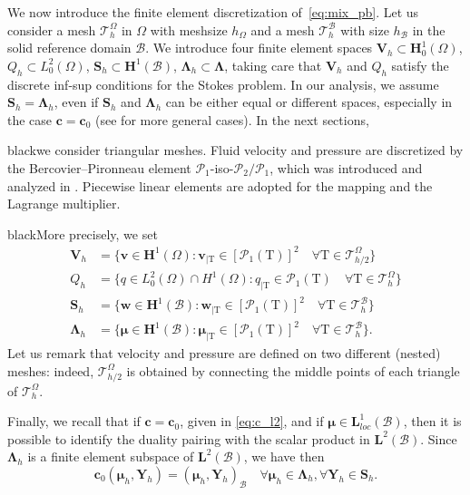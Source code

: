 \documentclass[oneside]{amsart} %
\newcommand\Huo{\mathbf{H}^1_0(\Omega)}%
\newcommand\Ldo{L^2_0(\Omega)} %
\newcommand\Hub{\mathbf{H}^1(\B)} %
\newcommand\HuOm{\mathbf{H}^1(\Omega)} %
\newcommand\LdBd{\mathbf{L}^2(\B)} %
\newcommand\B{\mathcal B} %
\renewcommand\v{\mathbf{v}} %
\renewcommand\c{\mathbf{c}} %
\newcommand\w{\mathbf{w}} %
\renewcommand\S{\mathbf{S}} %
\newcommand\Y{\mathbf{Y}} %
\newcommand\LL{{\boldsymbol{\Lambda}}} %
\newcommand\Vline{\mathbf{V}} %
\newcommand\Sline{\S} %
\newcommand\mmu{{\boldsymbol\mu}} %
\newcommand\T{\mathcal{T}} %
\newcommand\Pcal{\mathcal{P}}
\newcommand\tri{\mathrm{T}} %
\renewcommand\lg{\begin{color}{black}}
\newcommand\gl{\end{color}}
\begin{document}
	We now introduce the finite element discretization
	of~\eqref{eq:mix_pb}. Let us consider a mesh $\T_h^\Omega$ in $\Omega$ with
	meshsize $h_\Omega$ and a mesh $\T_h^\B$ with size $h_\B$ in the solid reference domain $\B$. We introduce four finite element spaces $\Vline_h\subset\Huo$, $Q_h\subset \Ldo$, $\Sline_h\subset \Hub$, $\LL_h\subset\LL$, taking care that $\Vline_h$ and $Q_h$ satisfy the discrete inf-sup conditions for the Stokes problem. In our analysis, we assume $\Sline_h=\LL_h$, even if $\Sline_h$ and $\LL_h$ can be either equal or different spaces, especially in the case $\c=\c_0$ (see \cite{najwa} for more general cases). 
	In the next sections, \lg we consider triangular meshes. Fluid
	velocity and pressure are discretized by the Bercovier--Pironneau element
	$\Pcal_1$-iso-$\Pcal_2/\Pcal_1$, which was introduced and analyzed in \cite{bercovier}. Piecewise linear elements are adopted for the mapping and the Lagrange multiplier. \gl
	\lg More precisely, we set
	\begin{equation}\label{eq:element}
		\begin{aligned}
			\Vline_h &= \{ \v\in\HuOm: \v_{\mid
				\tri}\in[\Pcal_1(\tri)]^2 \quad \forall \tri\in\T_{h/2}^\Omega \} \\
			Q_h &= \{q\in \Ldo\cap H^1(\Omega): q_{\mid \tri}\in \Pcal_1(\tri)\quad\forall \tri\in\T_{h}^\Omega\}\\
			\S_h &= \{\w\in\Hub:\w_{\mid \tri}\in [\Pcal_1(\tri)]^2\quad\forall \tri\in\mathcal{T}_{h}^\B\}\\
			\LL_h&=\{\mmu\in\Hub:\mmu_{\mid \tri}\in [\Pcal_1(\tri)]^2\quad\forall \tri\in\mathcal{T}_{h}^\B\}.
		\end{aligned}
	\end{equation}
	Let us remark that velocity and pressure are defined on two different
	(nested) meshes: indeed, $\T_{h/2}^\Omega$ is obtained by connecting the middle points of each triangle of $\T_h^\Omega$.
	\gl
	
	Finally, we recall that if $\c=\c_0$, given in \eqref{eq:c_l2}, and if
	$\mmu\in\mathbf{L}^1_{loc}(\B)$, then it is possible to identify the duality
	pairing with the scalar product in $\LdBd$. Since $\LL_h$ is a finite element
	subspace of $\LdBd$, we have then
	\begin{equation}\label{eq:c_l2_inner}
		\c_0(\mmu_h,\Y_h) = (\mmu_h,\Y_h)_\B \quad \forall\mmu_h\in\LL_h,\forall\Y_h\in\Sline_h.
	\end{equation}
	
\end{document}
